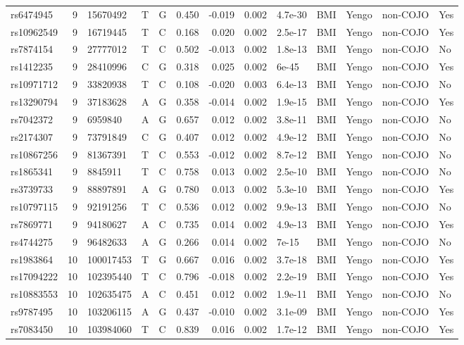 \documentclass[11pt,twoside]{bristolthesis}
\begin{document}
\begin{longtable}[t]{lrlllrrrlllll}
rs6474945 & 9 & 15670492 & T & G & 0.450 & -0.019 & 0.002 & 4.7e-30 & BMI & Yengo & non-COJO & Yes\\
rs10962549 & 9 & 16719445 & T & C & 0.168 & 0.020 & 0.002 & 2.5e-17 & BMI & Yengo & non-COJO & Yes\\
\addlinespace
rs7874154 & 9 & 27777012 & T & C & 0.502 & -0.013 & 0.002 & 1.8e-13 & BMI & Yengo & non-COJO & No\\
rs1412235 & 9 & 28410996 & C & G & 0.318 & 0.025 & 0.002 & 6e-45 & BMI & Yengo & non-COJO & Yes\\
rs10971712 & 9 & 33820938 & T & C & 0.108 & -0.020 & 0.003 & 6.4e-13 & BMI & Yengo & non-COJO & No\\
rs13290794 & 9 & 37183628 & A & G & 0.358 & -0.014 & 0.002 & 1.9e-15 & BMI & Yengo & non-COJO & Yes\\
rs7042372 & 9 & 6959840 & A & G & 0.657 & 0.012 & 0.002 & 3.8e-11 & BMI & Yengo & non-COJO & No\\
\addlinespace
rs2174307 & 9 & 73791849 & C & G & 0.407 & 0.012 & 0.002 & 4.9e-12 & BMI & Yengo & non-COJO & No\\
rs10867256 & 9 & 81367391 & T & C & 0.553 & -0.012 & 0.002 & 8.7e-12 & BMI & Yengo & non-COJO & No\\
rs1865341 & 9 & 8845911 & T & C & 0.758 & 0.013 & 0.002 & 2.5e-10 & BMI & Yengo & non-COJO & No\\
rs3739733 & 9 & 88897891 & A & G & 0.780 & 0.013 & 0.002 & 5.3e-10 & BMI & Yengo & non-COJO & Yes\\
rs10797115 & 9 & 92191256 & T & C & 0.536 & 0.012 & 0.002 & 9.9e-13 & BMI & Yengo & non-COJO & No\\
\addlinespace
rs7869771 & 9 & 94180627 & A & C & 0.735 & 0.014 & 0.002 & 4.9e-13 & BMI & Yengo & non-COJO & Yes\\
rs4744275 & 9 & 96482633 & A & G & 0.266 & 0.014 & 0.002 & 7e-15 & BMI & Yengo & non-COJO & No\\
rs1983864 & 10 & 100017453 & T & G & 0.667 & 0.016 & 0.002 & 3.7e-18 & BMI & Yengo & non-COJO & Yes\\
rs17094222 & 10 & 102395440 & T & C & 0.796 & -0.018 & 0.002 & 2.2e-19 & BMI & Yengo & non-COJO & Yes\\
rs10883553 & 10 & 102635475 & A & C & 0.451 & 0.012 & 0.002 & 1.9e-11 & BMI & Yengo & non-COJO & No\\
\addlinespace
rs9787495 & 10 & 103206115 & A & G & 0.437 & -0.010 & 0.002 & 3.1e-09 & BMI & Yengo & non-COJO & Yes\\
rs7083450 & 10 & 103984060 & T & C & 0.839 & 0.016 & 0.002 & 1.7e-12 & BMI & Yengo & non-COJO & Yes\\

\end{longtable}
\end{document}
